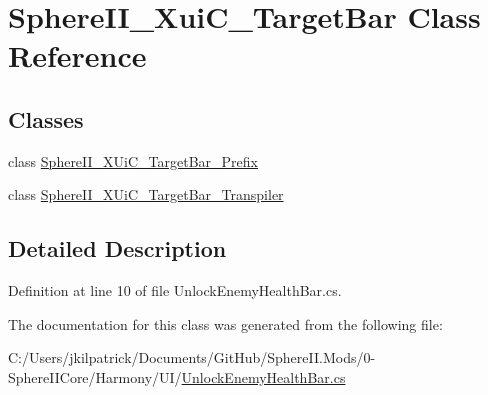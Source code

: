 \hypertarget{class_sphere_i_i___xui_c___target_bar}{}\section{Sphere\+I\+I\+\_\+\+Xui\+C\+\_\+\+Target\+Bar Class Reference}
\label{class_sphere_i_i___xui_c___target_bar}
\subsection*{Classes}
\begin{DoxyCompactItemize}
\item 
class \mbox{\hyperlink{class_sphere_i_i___xui_c___target_bar_1_1_sphere_i_i___x_ui_c___target_bar___prefix}{Sphere\+I\+I\+\_\+\+X\+Ui\+C\+\_\+\+Target\+Bar\+\_\+\+Prefix}}
\item 
class \mbox{\hyperlink{class_sphere_i_i___xui_c___target_bar_1_1_sphere_i_i___x_ui_c___target_bar___transpiler}{Sphere\+I\+I\+\_\+\+X\+Ui\+C\+\_\+\+Target\+Bar\+\_\+\+Transpiler}}
\end{DoxyCompactItemize}


\subsection{Detailed Description}


Definition at line 10 of file Unlock\+Enemy\+Health\+Bar.\+cs.



The documentation for this class was generated from the following file\+:\begin{DoxyCompactItemize}
\item 
C\+:/\+Users/jkilpatrick/\+Documents/\+Git\+Hub/\+Sphere\+I\+I.\+Mods/0-\/\+Sphere\+I\+I\+Core/\+Harmony/\+U\+I/\mbox{\hyperlink{_unlock_enemy_health_bar_8cs}{Unlock\+Enemy\+Health\+Bar.\+cs}}\end{DoxyCompactItemize}
